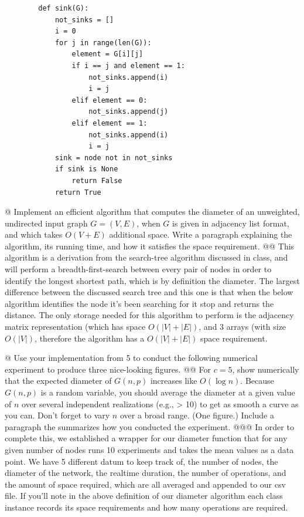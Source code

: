 \documentclass[10pt]{article}
\begin{document}
\begin{easylist}[enumerate]
    \begin{lstlisting}
        def sink(G):
            not_sinks = []
            i = 0
            for j in range(len(G)):
                element = G[i][j]
                if i == j and element == 1:
                    not_sinks.append(i)
                    i = j
                elif element == 0:
                    not_sinks.append(j)
                elif element == 1:
                    not_sinks.append(i)
                    i = j
            sink = node not in not_sinks
            if sink is None
                return False
            return True
    \end{lstlisting}

    @ Implement an efficient algorithm that computes the diameter of an unweighted, undirected input graph $G = (V, E)$,
    when $G$ is given in adjacency list format, and which takes $O(V + E)$ additional space. Write a paragraph
    explaining the algorithm, its running time, and how it satisfies the space requirement.
    @@ This algorithm is a derivation from the search-tree algorithm discussed in class, and will perform a
    breadth-first-search between every pair of nodes in order to identify the longest shortest path, which is by
    definition the diameter. The largest difference between the discussed search tree and this one is that when the
    below algorithm identifies the node it's been searching for it stop and returns the distance. The only storage
    needed for this algorithm to perform is the adjacency matrix representation (which has space $O(|V| + |E|)$, and 3
    arrays (with size $O(|V|)$, therefore the algorithm has a $O(|V| + |E|)$ space requirement.
    
    

    @ Use your implementation from 5 to conduct the following numerical experiment to produce three nice-looking
    figures.
    @@ For $c = 5$, show numerically that the expected diameter of $G(n, p)$ increases like $O(\log n)$. Because $G(n,
    p)$ is a random variable, you should average the diameter at a given value of $n$ over several independent
    realizations (e.g., > 10) to get as smooth a curve as you can. Don't forget to vary $n$ over a broad range. (One
    figure.) Include a paragraph the summarizes how you conducted the experiment.
    @@@ In order to complete this, we established a wrapper for our diameter function that for any given number of nodes
    runs 10 experiments and takes the mean values as a data point. We have 5 different datum to keep track of, the
    number of nodes, the diameter of the network, the realtime duration, the number of operations, and the amount of
    space required, which are all averaged and appended to our csv file. If you'll note in the above definition of our
    diameter algorithm each class instance records its space requirements and how many operations are required.


\end{easylist}
\end{document}
